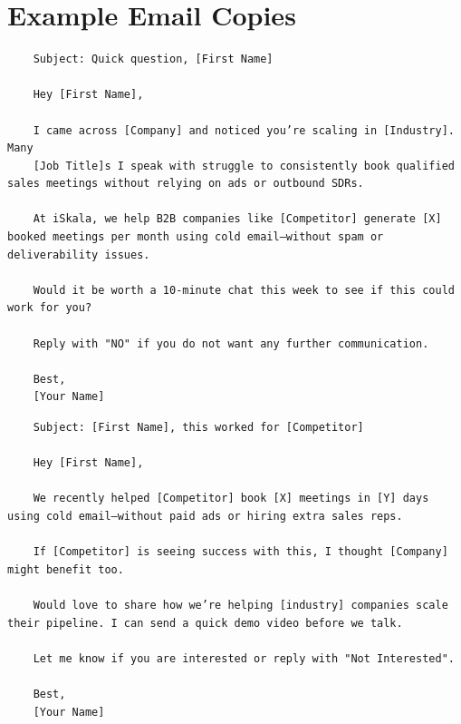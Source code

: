 \documentclass[12pt]{article}
\begin{document}
\newpage 


\section{Example Email Copies}

\begin{lstlisting}
	Subject: Quick question, [First Name]

	Hey [First Name],

	I came across [Company] and noticed you’re scaling in [Industry]. Many 
	[Job Title]s I speak with struggle to consistently book qualified sales meetings without relying on ads or outbound SDRs.

	At iSkala, we help B2B companies like [Competitor] generate [X] booked meetings per month using cold email—without spam or deliverability issues.

	Would it be worth a 10-minute chat this week to see if this could work for you?

	Reply with "NO" if you do not want any further communication.

	Best,
	[Your Name]
\end{lstlisting}

\begin{lstlisting}
	Subject: [First Name], this worked for [Competitor]

	Hey [First Name],

	We recently helped [Competitor] book [X] meetings in [Y] days using cold email—without paid ads or hiring extra sales reps.

	If [Competitor] is seeing success with this, I thought [Company] might benefit too.

	Would love to share how we’re helping [industry] companies scale their pipeline. I can send a quick demo video before we talk. 

	Let me know if you are interested or reply with "Not Interested".

	Best,
	[Your Name]
\end{lstlisting}
\end{document}
